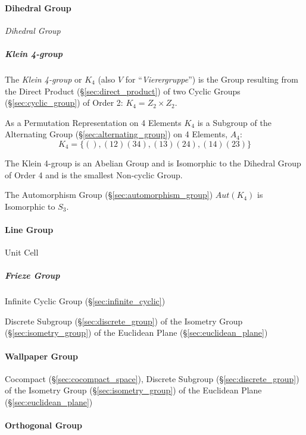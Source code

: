 \paragraph{Dihedral Group}\label{sec:dihedral_group}\hfill

\emph{Dihedral Group}


\subparagraph{Klein 4-group}\label{sec:klein_4group}\hfill

The \emph{Klein 4-group} or $K_4$ (also $V$ for
``\emph{Vierergruppe}'') is the Group resulting from the Direct
Product (\S\ref{sec:direct_product}) of two Cyclic Groups
(\S\ref{sec:cyclic_group}) of Order 2: $K_4 = Z_2 \times Z_2$.

As a Permutation Representation on 4 Elements $K_4$ is a Subgroup of
the Alternating Group (\S\ref{sec:alternating_group}) on 4 Elements,
$A_4$:
\[
    K_4 = \{ (), (12)(34), (13)(24), (14)(23) \}
\]

The Klein 4-group is an Abelian Group and is Isomorphic to the
Dihedral Group of Order 4 and is the smallest Non-cyclic Group.

The Automorphism Group (\S\ref{sec:automorphism_group}) $Aut(K_4)$ is
Isomorphic to $S_3$.



\paragraph{Line Group}\label{sec:line_group}\hfill

Unit Cell



\subparagraph{Frieze Group}\label{sec:frieze_group}\hfill

Infinite Cyclic Group (\S\ref{sec:infinite_cyclic})

Discrete Subgroup (\S\ref{sec:discrete_group}) of the Isometry Group
(\S\ref{sec:isometry_group}) of the Euclidean Plane
(\S\ref{sec:euclidean_plane})



\paragraph{Wallpaper Group}\label{sec:wallpaper_group}\hfill

Cocompact (\S\ref{sec:cocompact_space}), Discrete Subgroup
(\S\ref{sec:discrete_group}) of the Isometry Group (\S\ref{sec:isometry_group})
of the Euclidean Plane (\S\ref{sec:euclidean_plane})



\paragraph{Orthogonal Group}\label{sec:orthogonal_group}\hfill


